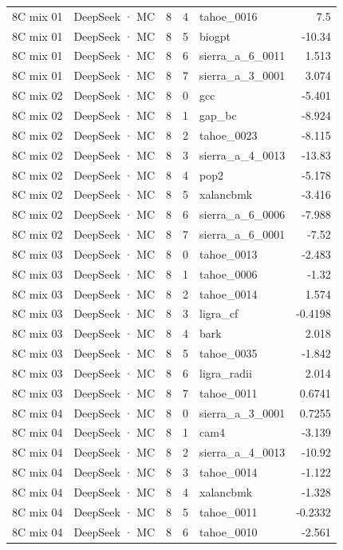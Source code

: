 \begin{tabular}{llrrlr}
8C mix 01 & DeepSeek · MC & 8 & 4 & tahoe\_0016 & 7.5 \\
8C mix 01 & DeepSeek · MC & 8 & 5 & biogpt & -10.34 \\
8C mix 01 & DeepSeek · MC & 8 & 6 & sierra\_a\_6\_0011 & 1.513 \\
8C mix 01 & DeepSeek · MC & 8 & 7 & sierra\_a\_3\_0001 & 3.074 \\
8C mix 02 & DeepSeek · MC & 8 & 0 & gcc & -5.401 \\
8C mix 02 & DeepSeek · MC & 8 & 1 & gap\_bc & -8.924 \\
8C mix 02 & DeepSeek · MC & 8 & 2 & tahoe\_0023 & -8.115 \\
8C mix 02 & DeepSeek · MC & 8 & 3 & sierra\_a\_4\_0013 & -13.83 \\
8C mix 02 & DeepSeek · MC & 8 & 4 & pop2 & -5.178 \\
8C mix 02 & DeepSeek · MC & 8 & 5 & xalancbmk & -3.416 \\
8C mix 02 & DeepSeek · MC & 8 & 6 & sierra\_a\_6\_0006 & -7.988 \\
8C mix 02 & DeepSeek · MC & 8 & 7 & sierra\_a\_6\_0001 & -7.52 \\
8C mix 03 & DeepSeek · MC & 8 & 0 & tahoe\_0013 & -2.483 \\
8C mix 03 & DeepSeek · MC & 8 & 1 & tahoe\_0006 & -1.32 \\
8C mix 03 & DeepSeek · MC & 8 & 2 & tahoe\_0014 & 1.574 \\
8C mix 03 & DeepSeek · MC & 8 & 3 & ligra\_cf & -0.4198 \\
8C mix 03 & DeepSeek · MC & 8 & 4 & bark & 2.018 \\
8C mix 03 & DeepSeek · MC & 8 & 5 & tahoe\_0035 & -1.842 \\
8C mix 03 & DeepSeek · MC & 8 & 6 & ligra\_radii & 2.014 \\
8C mix 03 & DeepSeek · MC & 8 & 7 & tahoe\_0011 & 0.6741 \\
8C mix 04 & DeepSeek · MC & 8 & 0 & sierra\_a\_3\_0001 & 0.7255 \\
8C mix 04 & DeepSeek · MC & 8 & 1 & cam4 & -3.139 \\
8C mix 04 & DeepSeek · MC & 8 & 2 & sierra\_a\_4\_0013 & -10.92 \\
8C mix 04 & DeepSeek · MC & 8 & 3 & tahoe\_0014 & -1.122 \\
8C mix 04 & DeepSeek · MC & 8 & 4 & xalancbmk & -1.328 \\
8C mix 04 & DeepSeek · MC & 8 & 5 & tahoe\_0011 & -0.2332 \\
8C mix 04 & DeepSeek · MC & 8 & 6 & tahoe\_0010 & -2.561 \\

\end{tabular}

